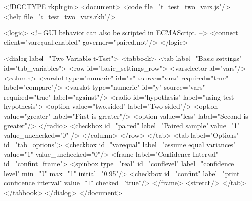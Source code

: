\begin{Code}
<!DOCTYPE rkplugin>
<document>
  <code file="t_test_two_vars.js"/>
  <help file="t_test_two_vars.rkh"/>

  <logic>
    <!-- GUI behavior can also be scripted in ECMAScript. -->
    <connect client="varequal.enabled" governor="paired.not"/>
  </logic>

  <dialog label="Two Variable t-Test">
    <tabbook>
      <tab label="Basic settings" id="tab_variables">
        <row id="basic_settings_row">
          <varselector id="vars"/>
          <column>
            <varslot type="numeric" id="x" source="vars" required="true"
              label="compare"/>                                                             
            <varslot type="numeric" id="y" source="vars" required="true"
              label="against"/>
            <radio id="hypothesis" label="using test hypothesis">
              <option value="two.sided" label="Two-sided"/>
              <option value="greater" label="First is greater"/>
              <option value="less" label="Second is greater"/>
            </radio>
            <checkbox id="paired" label="Paired sample" value="1" value_unchecked="0" />
          </column>
        </row>
      </tab>
      <tab label="Options" id="tab_options">
        <checkbox id="varequal" label="assume equal variances" value="1"
          value_unchecked="0"/>
        <frame label="Confidence Interval" id="confint_frame">
          <spinbox type="real" id="conflevel" label="confidence level" min="0" max="1"
            initial="0.95"/>
          <checkbox id="confint" label="print confidence interval" value="1"
            checked="true"/>
        </frame>
        <stretch/>
      </tab>
    </tabbook>
  </dialog>
</document>
\end{Code}

